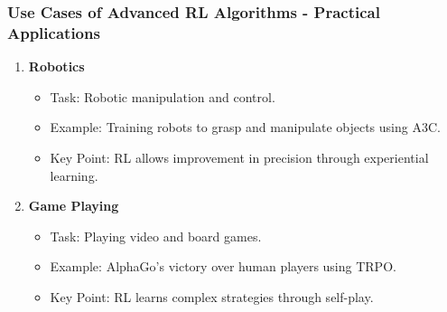 \documentclass{beamer}
\begin{document}
\begin{frame}[fragile]
    \frametitle{Use Cases of Advanced RL Algorithms - Practical Applications}
    \begin{enumerate}
        \item \textbf{Robotics}
            \begin{itemize}
                \item Task: Robotic manipulation and control.
                \item Example: Training robots to grasp and manipulate objects using A3C.
                \item Key Point: RL allows improvement in precision through experiential learning.
            \end{itemize}
        
        \item \textbf{Game Playing}
            \begin{itemize}
                \item Task: Playing video and board games.
                \item Example: AlphaGo's victory over human players using TRPO.
                \item Key Point: RL learns complex strategies through self-play.
            \end{itemize}
    \end{enumerate}
\end{frame}
\end{document}
